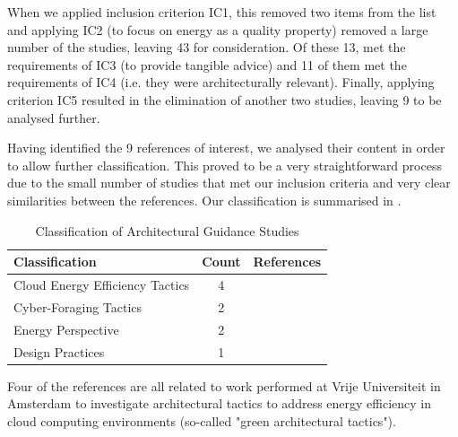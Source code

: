 When we applied inclusion criterion IC1, this removed two items from the list and applying IC2 (to focus on energy as a quality property) removed a large number of the studies, leaving 43 for consideration.  Of these 13, met the requirements of IC3 (to provide tangible advice) and 11 of them met the requirements of IC4 (i.e. they were architecturally relevant).  Finally, applying criterion IC5 resulted in the elimination of another two studies, leaving 9 to be analysed further.

Having identified the 9 references of interest, we analysed their content in order to allow further classification.  This proved to be a very straightforward process due to the small number of studies that met our inclusion criteria and very clear similarities between the references.  Our classification is summarised in .

\begin{table}
\caption{Classification of Architectural Guidance Studies}
\label{table:archguidancestudies}
\begin{center}
\begin{tabular}{| l | c | l |}
\hline

\textbf{Classification} & \textbf{Count} & \textbf{References} \\
\hline

Cloud Energy Efficiency Tactics & 4 & \cite{procaccianti2013-cloudenergyefficiency, procaccianti2014-greentactics, procaccianti2014-greentactics-wicsa, procaccianti2015-cloudenergy-litreview} \\
\hline

Cyber-Foraging Tactics & 2 & \cite{lewis2015-foragingtactics, lewis2016-foragingdm} \\
\hline

Energy Perspective & 2 & \cite{jagroep2015-energyperspective, jagroep2017-energyperspective} \\
\hline

Design Practices & 1 & \cite{procaccianti2016-twobestpractices} \\
\hline

\end{tabular}
\end{center}
\end{table}

Four of the references \cite{procaccianti2013-cloudenergyefficiency, procaccianti2014-greentactics-wicsa, procaccianti2015-cloudenergy-litreview} are all related to work performed at Vrije Universiteit in Amsterdam to investigate architectural tactics to address energy efficiency in cloud computing environments (so-called "green architectural tactics").

